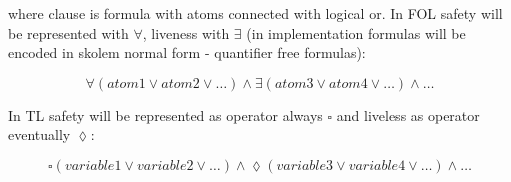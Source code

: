 \documentclass[a4paper,12pt]{article}
\begin{document}
\noindent
where clause is formula with atoms connected with logical or. In FOL safety will be represented with $\forall$, liveness with $\exists$ (in implementation formulas will be encoded in skolem normal form - quantifier free formulas):

\begin{equation}
  \forall(atom1 \lor atom2 \lor \dots) \land \exists(atom3 \lor atom4 \lor \dots) \land \dots
\end{equation}

\noindent
In TL safety will be represented as operator always $\square$ and liveless as operator eventually $\lozenge$:

\begin{equation}
  \square(variable1 \lor variable2 \lor \dots) \land \lozenge(variable3 \lor variable4 \lor \dots) \land \dots
\end{equation}
\end{document}
